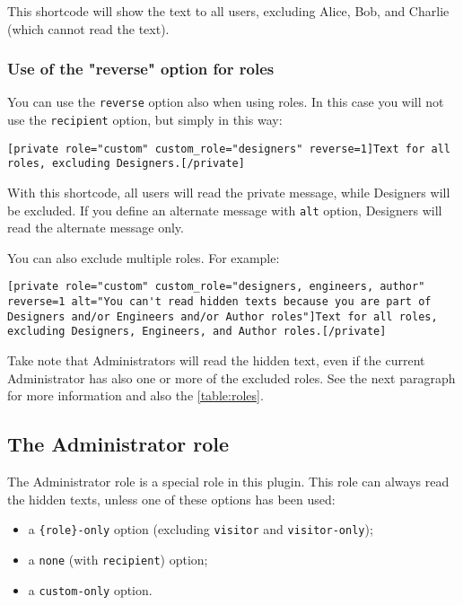 \documentclass[a4paper,10pt]{article}
\begin{document}
This shortcode will show the text to all users, excluding Alice, Bob, and Charlie (which cannot read the text).

\subsubsection{Use of the "reverse" option for roles}

You can use the \verb+reverse+ option also when using roles. In this case you will not use the \verb+recipient+ option, but simply in this way:

\begin{lstlisting}
[private role="custom" custom_role="designers" reverse=1]Text for all roles, excluding Designers.[/private]
\end{lstlisting}

With this shortcode, all users will read the private message, while Designers will be excluded. If you define an alternate message with \verb+alt+ option, Designers will read the alternate message only.

You can also exclude multiple roles. For example:

\begin{lstlisting}
[private role="custom" custom_role="designers, engineers, author" reverse=1 alt="You can't read hidden texts because you are part of Designers and/or Engineers and/or Author roles"]Text for all roles, excluding Designers, Engineers, and Author roles.[/private]
\end{lstlisting}

Take note that Administrators will read the hidden text, even if the current Administrator has also one or more of the excluded roles. See the next paragraph for more information and also the \ref{table:roles}.

\subsection{The Administrator role}

The Administrator role is a special role in this plugin. This role can always read the hidden texts, unless one of these options has been used:

\begin{itemize}
 \item a \verb+{role}-only+ option (excluding \verb+visitor+ and \verb+visitor-only+);
 \item a \verb+none+ (with \verb+recipient+) option;
 \item a \verb+custom-only+ option.
\end{itemize}
\end{document}
